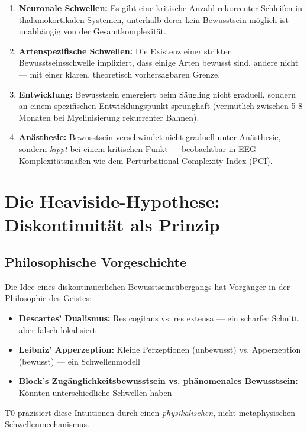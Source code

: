 \documentclass[11pt,a4paper]{article}
\begin{document}
	\begin{enumerate}
		\item \textbf{Neuronale Schwellen:} Es gibt eine kritische Anzahl rekurrenter Schleifen in thalamokortikalen Systemen, unterhalb derer kein Bewusstsein möglich ist — unabhängig von der Gesamtkomplexität.
		
		\item \textbf{Artenspezifische Schwellen:} Die Existenz einer strikten Bewusstseinsschwelle impliziert, dass einige Arten bewusst sind, andere nicht — mit einer klaren, theoretisch vorhersagbaren Grenze.
		
		\item \textbf{Entwicklung:} Bewusstsein emergiert beim Säugling nicht graduell, sondern an einem spezifischen Entwicklungspunkt sprunghaft (vermutlich zwischen 5-8 Monaten bei Myelinisierung rekurrenter Bahnen).
		
		\item \textbf{Anästhesie:} Bewusstsein verschwindet nicht graduell unter Anästhesie, sondern \emph{kippt} bei einem kritischen Punkt — beobachtbar in EEG-Komplexitätsmaßen wie dem Perturbational Complexity Index (PCI).
	\end{enumerate}
	
	\section{Die Heaviside-Hypothese: Diskontinuität als Prinzip}
	\label{sec:heaviside}
	
	\subsection{Philosophische Vorgeschichte}
	
	Die Idee eines diskontinuierlichen Bewusstseinsübergangs hat Vorgänger in der Philosophie des Geistes:
	\begin{itemize}
		\item \textbf{Descartes' Dualismus:} Res cogitans vs. res extensa — ein scharfer Schnitt, aber falsch lokalisiert
		\item \textbf{Leibniz' Apperzeption:} Kleine Perzeptionen (unbewusst) vs. Apperzeption (bewusst) — ein Schwellenmodell
		\item \textbf{Block's Zugänglichkeitsbewusstsein vs. phänomenales Bewusstsein:} Könnten unterschiedliche Schwellen haben
	\end{itemize}
	
	T0 präzisiert diese Intuitionen durch einen \emph{physikalischen}, nicht metaphysischen Schwellenmechanismus.
	
\end{document}
